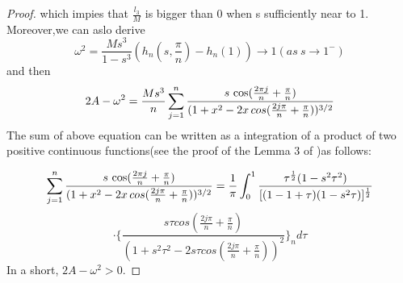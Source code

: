 \documentclass[11pt]{article}
\begin{document}
\begin{proof}
which impies that $\frac{l_3}{M}$ is bigger than 0 when s sufficiently near to 1. Moreover,we can aslo derive 
$$\omega^2=\frac{Ms^3}{1-s^3}(h_n(s,\frac{\pi}{n})-h_n(1))\to 1(as \ s\to 1^{-})$$
and then
$$2A-\omega^2=\frac{Ms^3}{n}\sum_{j=1}^n\frac{s \thinspace\cos(\frac{2\pi j}{n}+\frac{\pi}{n})}{(1+x^2-2x\thinspace cos(\frac{2j\pi}{n}+\frac{\pi}{n}))^{3/2}}$$
The sum of above equation can be written as a integration of a product of two positive continuous functions(see the proof of the  Lemma 3 of \cite{BaE2})as follows:

$$\sum_{j=1}^n\frac{s \thinspace\cos(\frac{2\pi j}{n}+\frac{\pi}{n})}{(1+x^2-2x\thinspace cos(\frac{2j\pi}{n}+\frac{\pi}{n}))^{3/2}}
=\frac{1}{\pi}\int_0^1\frac{\tau^{\frac{1}{2}}(1-s^2\tau^2)}{[(1-1+\tau)(1-s^2\tau)]^{\frac{1}{2}}}$$
$$
\cdot \Biggl\{\frac{s\tau cos(\frac{2j\pi}{n}+\frac{\pi}{n})}{(1+s^2\tau^2-2s\tau cos(\frac{2j\pi}{n}+\frac{\pi}{n}))^2}\Biggr\}_n
 d\tau$$
In a short, $ 2A-\omega^2>0.$
\end{proof}
 
\end{document}
